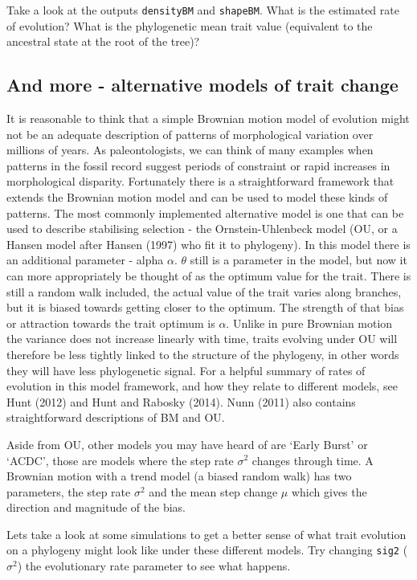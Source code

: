 \documentclass[]{article}
\begin{document}
Take a look at the outputs \texttt{densityBM} and \texttt{shapeBM}. What
is the estimated rate of evolution? What is the phylogenetic mean trait
value (equivalent to the ancestral state at the root of the tree)?

\subsection{And more - alternative models of trait
change}\label{and-more---alternative-models-of-trait-change}

It is reasonable to think that a simple Brownian motion model of
evolution might not be an adequate description of patterns of
morphological variation over millions of years. As paleontologists, we
can think of many examples when patterns in the fossil record suggest
periods of constraint or rapid increases in morphological disparity.
Fortunately there is a straightforward framework that extends the
Brownian motion model and can be used to model these kinds of patterns.
The most commonly implemented alternative model is one that can be used
to describe stabilising selection - the Ornstein-Uhlenbeck model (OU, or
a Hansen model after Hansen (1997) who fit it to phylogeny). In this
model there is an additional parameter - alpha \(\alpha\). \(\theta\)
still is a parameter in the model, but now it can more appropriately be
thought of as the optimum value for the trait. There is still a random
walk included, the actual value of the trait varies along branches, but
it is biased towards getting closer to the optimum. The strength of that
bias or attraction towards the trait optimum is \(\alpha\). Unlike in
pure Brownian motion the variance does not increase linearly with time,
traits evolving under OU will therefore be less tightly linked to the
structure of the phylogeny, in other words they will have less
phylogenetic signal. For a helpful summary of rates of evolution in this
model framework, and how they relate to different models, see Hunt
(2012) and Hunt and Rabosky (2014). Nunn (2011) also contains
straightforward descriptions of BM and OU.

Aside from OU, other models you may have heard of are `Early Burst' or
`ACDC', those are models where the step rate \(\sigma^{2}\) changes
through time. A Brownian motion with a trend model (a biased random
walk) has two parameters, the step rate \(\sigma^{2}\) and the mean step
change \(\mu\) which gives the direction and magnitude of the bias.

Lets take a look at some simulations to get a better sense of what trait
evolution on a phylogeny might look like under these different models.
Try changing \texttt{sig2} (\(\sigma^{2}\)) the evolutionary rate
parameter to see what happens.
\end{document}
